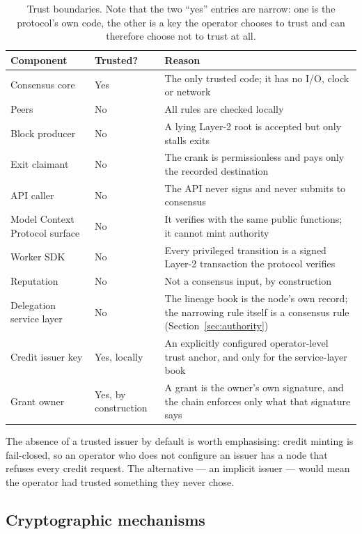 \documentclass{article}
\begin{document}
\begin{table}[t]
\centering
\begin{tabular}{@{}p{}p{}p{}@{}}
\toprule
\textbf{Component} & \textbf{Trusted?} & \textbf{Reason} \\
\midrule
Consensus core & Yes & The only trusted code; it has no I/O, clock or network \\
Peers & No & All rules are checked locally \\
Block producer & No & A lying Layer-2 root is accepted but only stalls exits \\
Exit claimant & No & The crank is permissionless and pays only the recorded
  destination \\
API caller & No & The API never signs and never submits to consensus \\
Model Context Protocol surface & No & It verifies with the same public
  functions; it cannot mint authority \\
Worker SDK & No & Every privileged transition is a signed Layer-2 transaction
  the protocol verifies \\
Reputation & No & Not a consensus input, by construction \\
Delegation service layer & No & The lineage book is the node's own record; the
  narrowing rule itself is a consensus rule (Section~\ref{sec:authority}) \\
Credit issuer key & Yes, locally & An explicitly configured operator-level
  trust anchor, and only for the service-layer book \\
Grant owner & Yes, by construction & A grant is the owner's own signature, and
  the chain enforces only what that signature says \\
\bottomrule
\end{tabular}
\caption{Trust boundaries. Note that the two ``yes'' entries are narrow: one is
the protocol's own code, the other is a key the operator chooses to trust and
can therefore choose not to trust at all.}
\label{tab:trust}
\end{table}

The absence of a trusted issuer by default is worth emphasising: credit minting
is fail-closed, so an operator who does not configure an issuer has a node that
refuses every credit request. The alternative --- an implicit issuer --- would
mean the operator had trusted something they never chose.

\subsection{Cryptographic mechanisms}
\end{document}

